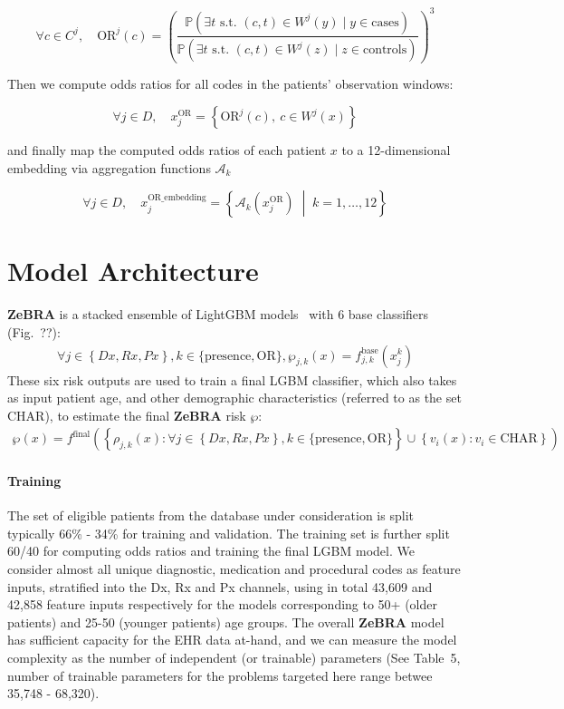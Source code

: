 \documentclass[onecolumn, compsoc,11pt]{IEEEtran}
\def\zebra{\textbf{ZeBRA}\xspace}
\def\EQSP{3pt}
\newcommand{\cgather}[2][\EQSP]{\begingroup\setlength\abovedisplayskip{#1}\setlength\belowdisplayskip{#1}\begin{gather} #2 \end{gather}\endgroup\noindent}
\def\zebra{\textbf{ZeBRA}\xspace}
\def\zcor{\zebra}
\begin{document}
\begin{equation}
\forall c \in C^j, \quad \text{OR}^j(c) = \left( \frac{\mathbb{P}(\exists t \text{ s.t. } (c, t) \in W^j(y) \mid y \in \text{cases})}{\mathbb{P}(\exists t \text{ s.t. } (c, t) \in W^j(z) \mid z \in \text{controls})} \right)^3
\end{equation}

Then we compute odds ratios for all codes in the patients' observation windows:

\begin{equation}
\forall j \in D, \quad x^{\text{OR}}_j = \left\{ \text{OR}^j(c), \ c \in W^j(x) \right\}
\end{equation}

and finally map the computed odds ratios of each patient $x$ to a 12-dimensional embedding via aggregation functions $\mathcal{A}_k$

\begin{equation}
\forall j \in D, \quad x^{\text{OR\_embedding}}_j = \left\{ \mathcal{A}_k\left(x^{\text{OR}}_j \right) \;\middle|\; k = 1, \ldots, 12 \right\}
\end{equation}


\section*{Model Architecture}
\zcor is a stacked ensemble of LightGBM models~\cite{ke2017lightgbm} with $6$ base classifiers (Fig.~??):
\cgather{
\forall j \in \left  \{Dx,Rx,Px \right \},   k \in \{\text{presence}, \text{OR}\}, \wp_{j,k}(x) = f^{\text{base}}_{j,k}(x_j^k)
}
These six risk outputs are used to train a final LGBM classifier, which also takes  as input patient age, and other demographic characteristics (referred to as the set $\text{CHAR}$), to estimate the final \zcor risk $\wp$:
\cgather{
\wp(x) = f^{\text{final}}\left (\left \{ \rho_{j,k}(x):\forall j \in \left  \{Dx,Rx,Px \right \},   k \in \{\text{presence}, \text{OR}\}  \right  \}\cup \left \{v_i(x): v_i \in \text{CHAR} \right \} \right )
}
\paragraph*{Training} The  set of eligible patients from the database under consideration  is split typically 66\% - 34\% for training and validation. The training set is further split 60/40 for computing odds ratios and training the final LGBM model.
We consider almost all unique  diagnostic, medication and procedural codes as feature inputs, stratified into the Dx, Rx and Px channels, using in total 43,609 and 42,858 feature inputs respectively for the models corresponding to  50+ (older patients)  and 25-50 (younger patients) age groups. The overall \zcor model has sufficient capacity for the EHR data at-hand, and we can measure the model  complexity as the number of independent (or trainable) parameters (See Table~5, number of trainable parameters for the problems targeted here range betwee 35,748 - 68,320). 
\end{document}

